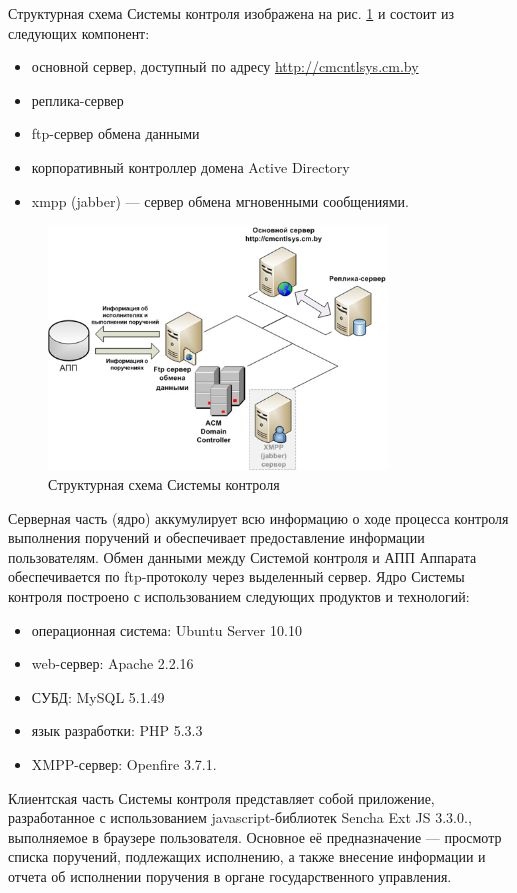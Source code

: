 \documentclass[10pt, a5paper]{article}
\begin{document}
Структурная схема Системы контроля изображена на рис. \ref{R2} и состоит из следующих компонент:

\begin{itemize}
  \item основной сервер, доступный по адресу \url{http://cmcntlsys.cm.by}
  \item реплика-сервер
  \item ftp-сервер обмена данными
  \item корпоративный контроллер домена Active Directory
  \item xmpp (jabber) --- сервер обмена мгновенными сообщениями.
\end{itemize}

\begin{figure}[htpb]
  \centering
  \includegraphics[width=9cm]{110_2012_w_cmcntrlsys_figure2_1.jpg}
\caption{Структурная схема Системы контроля}
  \label{R2}
\end{figure}
Серверная часть (ядро) аккумулирует всю информацию о ходе процесса контроля выполнения поручений и обеспечивает предоставление информации пользователям.  Обмен данными между Системой контроля и АПП Аппарата обеспечивается по ftp-протоколу через выделенный сервер. Ядро Системы контроля построено с использованием следующих продуктов и технологий:

\begin{itemize}
  \item операционная система: Ubuntu Server 10.10
  \item web-сервер: Apache 2.2.16
  \item СУБД: MySQL 5.1.49
  \item язык разработки: PHP 5.3.3
  \item XMPP-сервер: Openfire 3.7.1.
\end{itemize}

Клиентская часть Системы контроля представляет собой приложение, разработанное с использованием javascript-библиотек Sencha Ext JS 3.3.0., выполняемое в браузере пользователя. Основное её предназначение --- просмотр списка поручений, подлежащих исполнению, а также внесение информации и отчета об исполнении поручения в органе государственного управления.
\end{document}
